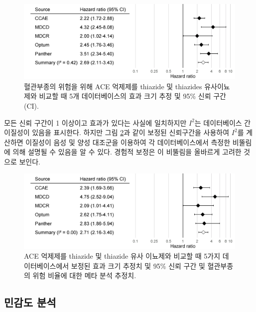 \documentclass[10.5pt]{book}
\theoremstyle{definition}
\theoremstyle{definition}
\theoremstyle{definition}
\theoremstyle{remark}
\begin{document}
\begin{figure}

{\centering \includegraphics[width=0.9\linewidth]{images/MethodValidity/forest} 

}

\caption{혈관부종의 위험을 위해 ACE 억제제를 thiazide 및 thiazides 유사이뇨제와 비교할 때 5개 데이터베이스의 효과 크기 추정 및 95\% 신뢰 구간(CI).}\label{fig:forest}
\end{figure}

모든 신뢰 구간이 1 이상이고 효과가 있다는 사실에 일치하지만 \(I^2\)는
데이터베이스 간 이질성이 있음을 표시한다. 하지만 그림
\ref{fig:forestCal}과 같이 보정된 신뢰구간을 사용하여 \(I^2\)를 계산하면
이질성이 음성 및 양성 대조군을 이용하여 각 데이터베이스에서 측정한
비뚤림에 의해 설명될 수 있음을 알 수 있다. 경험적 보정은 이 비뚤림을
올바르게 고려한 것으로 보인다.

\begin{figure}

{\centering \includegraphics[width=0.9\linewidth]{images/MethodValidity/forestCal} 

}

\caption{ACE 억제제를 thiazide 및 thiazide 유사 이뇨제와 비교할 때 5가지 데이터베이스에서 보정된 효과 크기 추정치 및 95\% 신뢰 구간 및 혈관부종의 위험 비율에 대한 메타 분석 추정치.}\label{fig:forestCal}
\end{figure}

\subsection{민감도 분석}\label{--1}
\end{document}
